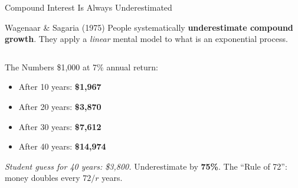 \documentclass[aspectratio=169]{beamer}
\begin{document}
\begin{frame}{Compound Interest Is Always Underestimated}
\begin{block}{Wagenaar \& Sagaria (1975)}
People systematically \textbf{underestimate compound growth}. They apply a \textit{linear} mental model to what is an exponential process.
\end{block}
\begin{columns}
\begin{alertblock}{The Numbers}
\small\$1,000 at 7\% annual return:
\begin{itemize}\setlength{\itemsep}{0pt}
  \item After 10 years: \textbf{\$1,967}
  \item After 20 years: \textbf{\$3,870}
  \item After 30 years: \textbf{\$7,612}
  \item After 40 years: \textbf{\$14,974}
\end{itemize}
\textit{Student guess for 40 years: \$3,800.} Underestimate by \textbf{75\%}. The ``Rule of 72'': money doubles every $72/r$ years.
\end{alertblock}
\end{columns}
\end{frame}
\end{document}
